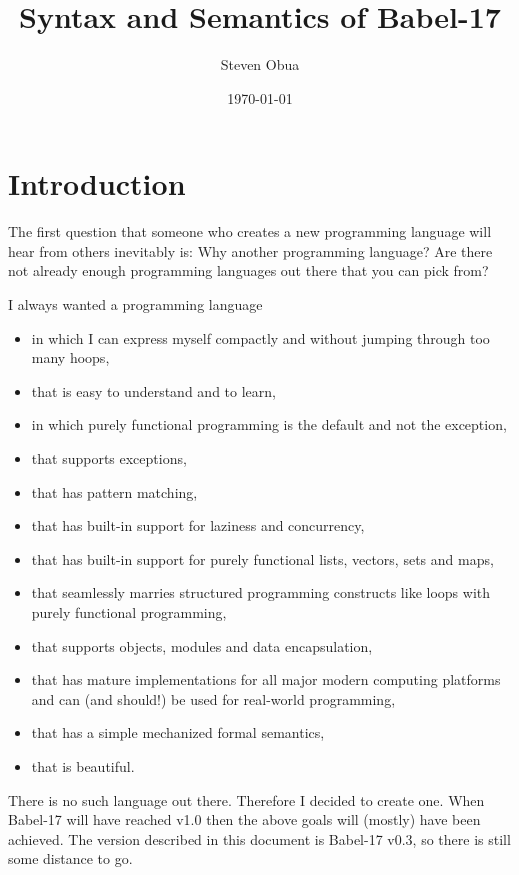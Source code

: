 \documentclass[11pt]{amsart}
\title{Syntax and Semantics of Babel-17}
\author{Steven Obua}
\date{\today}
\begin{document}


\maketitle

\tableofcontents


\section{Introduction}
The first question that someone who creates a new programming language will  hear from others inevitably is: Why another programming language? Are there not already enough programming languages out there that you can pick from?

I always wanted a programming language 
\begin{itemize}
\item in which I can express myself compactly and without jumping through too many hoops, 
\item that is easy to understand and to learn,
\item in which purely functional programming is the default and not the exception,
\item that supports exceptions,
\item that has pattern matching,
\item that has built-in support for laziness and concurrency,
\item that has built-in support for purely functional lists, vectors, sets and maps,
\item that seamlessly marries structured programming constructs like loops with purely functional programming,
\item that supports objects, modules and data encapsulation,
\item that has mature implementations for all major modern computing platforms and can (and should!) be used for real-world programming,
\item that has a simple mechanized formal semantics,
\item that is beautiful.
\end{itemize}
There is no such language out there. Therefore I decided to create one. When Babel-17 will have reached v1.0 then the above goals will (mostly) have been achieved. The version described in this document is Babel-17 v0.3, so there is still some distance to go. 
\end{document}
